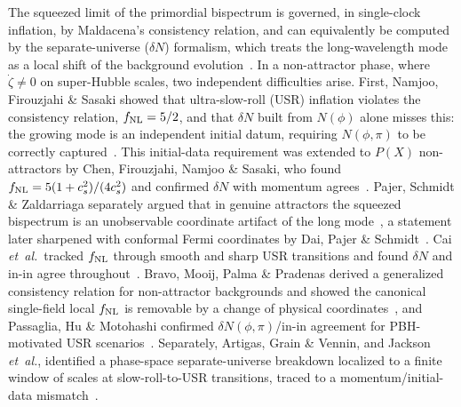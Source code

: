 \documentclass[aps,prd,twocolumn,superscriptaddress,showpacs,preprintnumbers,nofootinbib,longbibliography,floatfix]{revtex4-2}
\newcommand{\fnl}{f_{\rm NL}}
\newcommand{\etal}{\textit{et~al.}}
\begin{document}
The squeezed limit of the primordial bispectrum is governed, in single-clock inflation, by
Maldacena's consistency relation, and can equivalently be computed by the separate-universe
($\delta N$) formalism, which treats the long-wavelength mode as a local shift of the
background evolution~\cite{Maldacena2003}. In a non-attractor phase, where $\dot\zeta\neq0$
on super-Hubble scales, two independent difficulties arise. First,
Namjoo, Firouzjahi \& Sasaki showed that ultra-slow-roll (USR) inflation violates the
consistency relation, $\fnl=5/2$, and that $\delta N$ built from $N(\phi)$ alone misses
this: the growing mode is an independent initial datum, requiring $N(\phi,\pi)$ to be
correctly captured~\cite{Namjoo2013}. This initial-data requirement was extended to
$P(X)$ non-attractors by Chen, Firouzjahi, Namjoo \& Sasaki, who found
$\fnl=5(1+c_s^2)/(4c_s^2)$ and confirmed $\delta N$ with momentum
agrees~\cite{Chen2013}. Pajer, Schmidt \& Zaldarriaga separately argued that in genuine
attractors the squeezed bispectrum is an unobservable coordinate artifact of the long
mode~\cite{Pajer2013}, a statement later sharpened with conformal Fermi coordinates by
Dai, Pajer \& Schmidt~\cite{Dai2015}. Cai \etal\ tracked $\fnl$ through smooth and sharp
USR transitions and found $\delta N$ and in-in agree throughout~\cite{Cai2018}. Bravo,
Mooij, Palma \& Pradenas derived a generalized consistency relation for non-attractor
backgrounds and showed the canonical single-field local $\fnl$ is removable by a change of
physical coordinates~\cite{Bravo2018a,Bravo2018b}, and Passaglia, Hu \& Motohashi confirmed
$\delta N(\phi,\pi)$/in-in agreement for PBH-motivated USR
scenarios~\cite{Passaglia2019}. Separately, Artigas, Grain \& Vennin, and Jackson
\etal, identified a phase-space separate-universe breakdown localized to a finite window of
scales at slow-roll-to-USR transitions, traced to a momentum/initial-data
mismatch~\cite{Artigas2022,Jackson2023}.
\end{document}
